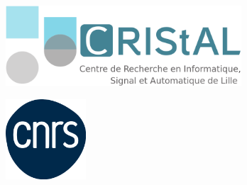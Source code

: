 \begin{titlepage}
\begin{minipage}{.25\linewidth}
\includegraphics[height=3cm]{../images-figures/logoCRIStAL.png}
\end{minipage}
\hspace{7cm}
\begin{minipage}{.25\linewidth}
\includegraphics[height=3cm]{../images-figures/cnrs.png}
\end{minipage}

\end{titlepage}
